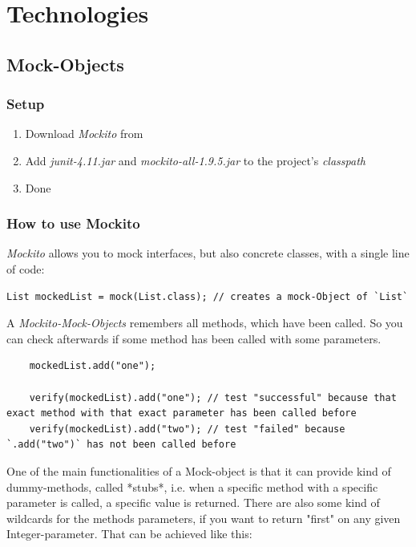 \documentclass[11pt, a4paper]{article}
\begin{document}
\newpage

\section{Technologies}
\subsection{Mock-Objects}
\subsubsection{Setup}

\begin{enumerate}
	\item Download \textit{Mockito} from \cite{MockitoDownload}
	\item Add \textit{junit-4.11.jar} and \textit{mockito-all-1.9.5.jar} to the project's \textit{classpath}
	\item Done
\end{enumerate}

\subsubsection{How to use Mockito}

\textit{Mockito} allows you to mock interfaces, but also concrete classes, with a single line of code:
	
\begin{lstlisting} 
List mockedList = mock(List.class); // creates a mock-Object of `List` 
\end{lstlisting}
	
A \textit{Mockito-Mock-Objects} remembers all methods, which have been called. So you can check afterwards if some method has been called with some parameters.
	
\begin{lstlisting}
	mockedList.add("one");
	    
	verify(mockedList).add("one"); // test "successful" because that exact method with that exact parameter has been called before
	verify(mockedList).add("two"); // test "failed" because `.add("two")` has not been called before
\end{lstlisting}

One of the main functionalities of a Mock-object is that it can provide kind of dummy-methods, called *stubs*, i.e. when a specific method with a specific parameter is called, a specific
value is returned. There are also some kind of wildcards for the methods parameters, if you want to return "first" on any given Integer-parameter. That can be achieved like this:
\end{document}
